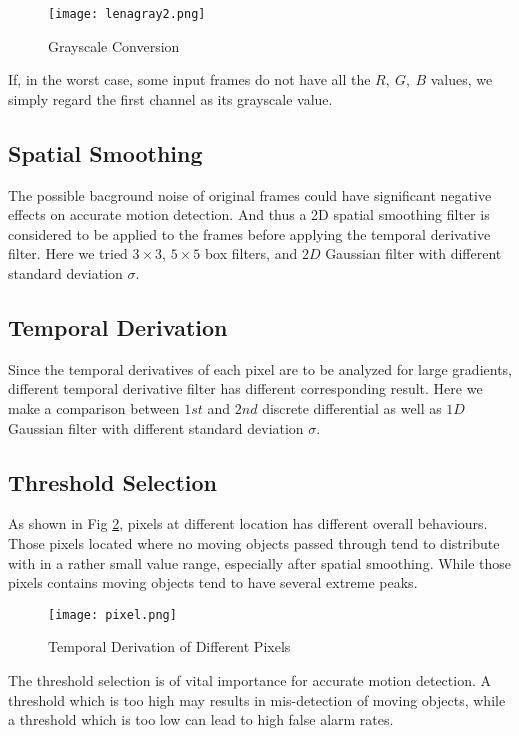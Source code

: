 \documentclass[letterpaper, 10 pt, conference]{ieeeconf}
\begin{document}
\begin{figure}[thpb]
\centering
\texttt{[image: lenagray2.png]}
\caption{Grayscale Conversion}
\label{gray}
\end{figure}
If, in the worst case, some input frames do not have all the $R,\ G,\ B$ values, we simply regard the first channel as its grayscale value.

\subsection{Spatial Smoothing}
The possible bacground noise of original frames could have significant negative effects on accurate motion detection. And thus a 2D spatial smoothing filter is considered to be applied to the frames before applying the temporal derivative filter. Here we tried $3\times3$, $5\times5$ box filters, and $2D$ Gaussian filter with different standard deviation $\sigma$.

\subsection{Temporal Derivation} 
Since the temporal derivatives of each pixel are to be analyzed for large gradients, different temporal derivative filter has different corresponding result. Here we make a comparison between $1st$ and $2nd$ discrete differential as well as $1D$ Gaussian filter with different standard deviation $\sigma$.

\subsection{Threshold Selection}
As shown in Fig \ref{thres}, pixels at different location has different overall behaviours. Those pixels located where no moving objects passed through tend to distribute with in a rather small value range, especially after spatial smoothing. While those pixels contains moving objects tend to have several extreme peaks.

\begin{figure}[thpb]
\centering
\texttt{[image: pixel.png]}
\caption{Temporal Derivation of Different Pixels}
\label{thres}
\end{figure}

The threshold selection is of vital importance for accurate motion detection. A threshold which is too high may results in mis-detection of moving objects, while a threshold which is too low can lead to high false alarm rates.
\end{document}
